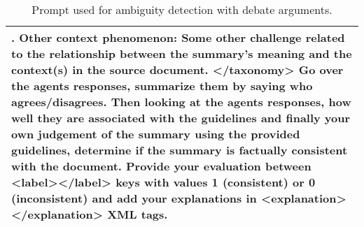 \begin{table*}
\begin{tabular}{@{}p{14cm}@{}}
    \newline
    15. Other context phenomenon: Some other challenge related to the relationship between the summary's meaning and the context(s) in the source document.
    \newline
    </taxonomy>
\newline
\newline
Go over the agents responses, summarize them by saying who agrees/disagrees. Then looking at the agents responses, how well they are associated with the guidelines and finally your own judgement of the summary using the provided guidelines, determine if the summary is factually consistent with the document. Provide your evaluation between <label></label> keys with values 1 (consistent) or 0 (inconsistent) and add your explanations in <explanation></explanation> XML tags.
    \\ 
 \bottomrule
\end{tabular}
\caption{Prompt used for ambiguity detection with debate arguments.}
\label{tab:ambiguity_w_args_prompt}
\end{table*}